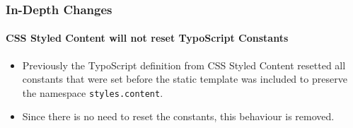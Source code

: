 
\begin{frame}[fragile]
	\frametitle{In-Depth Changes}
	\framesubtitle{CSS Styled Content will not reset TypoScript Constants}

	\begin{itemize}
		\item Previously the TypoScript definition from CSS Styled Content resetted all constants
			that were set before the static template was included to preserve the namespace
			\texttt{styles.content}.

		\item Since there is no need to reset the constants, this behaviour is removed.
	\end{itemize}

\end{frame}


